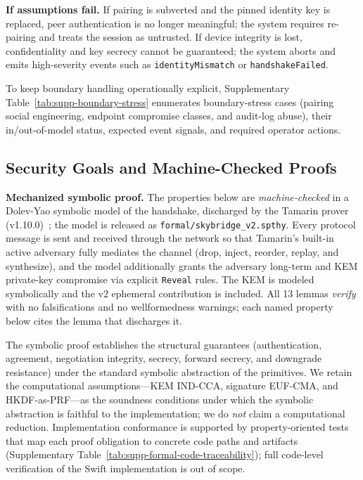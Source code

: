\documentclass[10pt,journal,compsoc]{IEEEtran}
\begin{document}
\textbf{If assumptions fail.} If pairing is subverted and the pinned
identity key is replaced, peer authentication is no longer meaningful;
the system requires re-pairing and treats the session as untrusted. If
device integrity is lost, confidentiality and key secrecy cannot be
guaranteed; the system aborts and emits high-severity events such as
\texttt{identity}\allowbreak\texttt{Mismatch} or
\texttt{handshake}\allowbreak\texttt{Failed}.

To keep boundary handling operationally explicit, Supplementary
Table~\ref{tab:supp-boundary-stress} enumerates boundary-stress cases
(pairing social engineering, endpoint compromise classes, and audit-log
abuse), their in/out-of-model status, expected event signals, and
required operator actions.

\subsection{Security Goals and Machine-Checked
Proofs}\label{b.-security-goals-and-proof-sketches}

\textbf{Mechanized symbolic proof.} The properties below are
\emph{machine-checked} in a Dolev-Yao symbolic model of the handshake,
discharged by the Tamarin prover (v1.10.0)~\cite{ref43}; the model is
released as \texttt{formal/skybridge\_v2.spthy}. Every protocol message
is sent and received through the network so that Tamarin's built-in
active adversary fully mediates the channel (drop, inject, reorder,
replay, and synthesize), and the model additionally grants the adversary
long-term and KEM private-key compromise via explicit \texttt{Reveal}
rules. The KEM is modeled symbolically and the v2 ephemeral contribution
is included. All 13 lemmas \emph{verify} with no falsifications and no
wellformedness warnings; each named property below cites the lemma that
discharges it.

The symbolic proof establishes the structural guarantees (authentication,
agreement, negotiation integrity, secrecy, forward secrecy, and
downgrade resistance) under the standard symbolic abstraction of the
primitives. We retain the computational assumptions---KEM IND-CCA,
signature EUF-CMA, and HKDF-as-PRF---as the soundness conditions under
which the symbolic abstraction is faithful to the implementation; we do
\emph{not} claim a computational reduction. Implementation conformance is
supported by property-oriented tests that map each proof obligation to
concrete code paths and artifacts (Supplementary
Table~\ref{tab:supp-formal-code-traceability}); full code-level
verification of the Swift implementation is out of scope.
\end{document}
